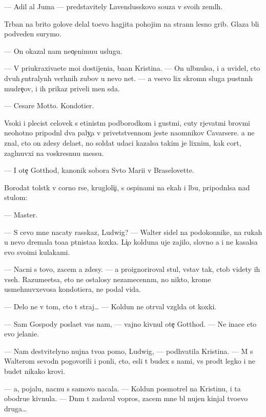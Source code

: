 \documentclass[10pt]{book}
\begin{document}
— Adil al Juma — predstavitely Lavendusskovo so{\y}uza v svo{\y}ih zeml{\ia}h.

T{\io}rban na brito{\y} golove delal to{\x}evo hagjita pohojim na strann{\yi}{\y} lesno{\y} grib. Glaza b{\yi}li podveden{\yi} surymo{\y}.

— On okazal nam neo{\c}enimu{\y}u uslugu.

— V{\yi} priukraxiva{\y}ete mo{\y}i dostijeni{\y}a, ba{\y}an Kristina. — On ul{\yi}bnulsa, i {\y}a uvidel, cto dvuh {\c}entralyn{\yi}h verhnih zubov u nevo net. — {\Y}a vsevo lix skromn{\yi}{\y} sluga pust{\yi}nn{\yi}h mudre{\c}ov, i ih prikaz{\yi} priveli men{\ia} s{\io}da.

— Cesare Motto. Kondotier.

V{\yi}soki{\y} i plecist{\yi}{\y} celovek s {\x}etinist{\yi}m podborodkom i gust{\yi}mi, cuty r{\yi}je\-va\-t{\yi}\-mi brov{\ia}mi neohotno pripodn{\ia}l dva paly{\c}a v privetstvennom jeste na{\y}om\-ni\-kov Cavarsere. {\Y}a ne znal, cto on zdesy dela{\y}et, no soldat udaci kazalsa takim je lixnim, kak cort, zagl{\ia}nuvxi{\y} na voskresnu{\y}u messu.

— I ote{\c} Gotthod, kanonik sobora Sv{\ia}to{\y} Mari{\y}i v Braselovette.

Borodat{\yi}{\y} tolst{\ia}k v corno{\y} r{\ia}se, krugloli{\c}i{\y}, s ospinami na {\x}ekah i lbu, pri\-podn{\ia}l\-sa nad stulom:

— Master.

— S cevo mne nacaty rasskaz, Ludwig? — Walter sidel na podokonnike, na rukah u nevo dremala to{\x}a{\y}a p{\ia}tnista{\y}a koxka. Li{\c}o kolduna uje zajilo, slovno {\y}a i ne kasalsa {\y}evo svo{\y}imi kulakami.

— Nacni s tovo, zacem {\y}a zdesy. — {\Y}a proignoriroval stul, vstav tak, ctob{\yi} videty ih vseh. Razume{\y}etsa, eto ne ostalosy nezamecenn{\yi}m, no nikto, krome usmeh\-nuv\-xe\-vosa kondotiera, ne podal vida.

— Delo ne v tom, cto t{\yi} straj… — Koldun ne otr{\yi}val vzgl{\ia}da ot koxki.

— Sam Gospody pos{\yi}la{\y}et vas nam, — vajno kivnul ote{\c} Gotthod. — Ne inace eto {\y}evo jelani{\y}e.

— Nam de{\y}stvitelyno nujna tvo{\y}a pomo{\x}, Ludwig, — podhvatila Kristina. — M{\yi} s Walterom sevodn{\ia} pogovorili i pon{\ia}li, cto, {\y}esli t{\yi} budex s nami, vs{\e} pro{\y}d{\e}t legko i ne budet nikako{\y} krovi.

— {\Y}a, pojalu{\y}, nacnu s samovo nacala. — Koldun posmotrel na Kristinu, i ta obodr{\ia}{\y}u{\x}e kivnula. — Dn{\e}m t{\yi} zadaval vopros, zacem mne b{\yi}l nujen kinjal tvo{\y}evo druga…
\end{document}
